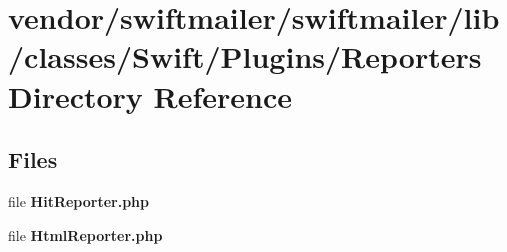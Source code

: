 \section{vendor/swiftmailer/swiftmailer/lib/classes/\+Swift/\+Plugins/\+Reporters Directory Reference}
\label{dir_388393a4713e9efd47eecbb34113cd99}
\subsection*{Files}
\begin{DoxyCompactItemize}
\item 
file {\bf Hit\+Reporter.\+php}
\item 
file {\bf Html\+Reporter.\+php}
\end{DoxyCompactItemize}
